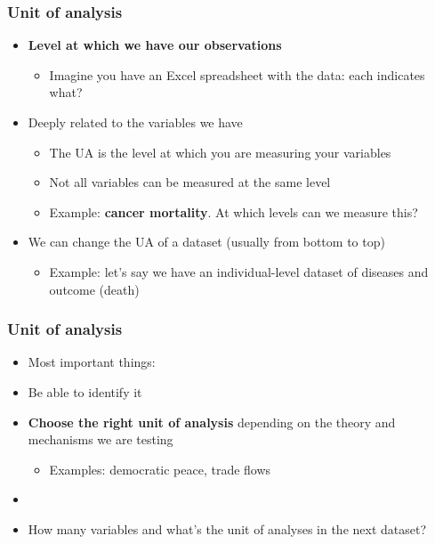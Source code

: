 \documentclass[aspectratio=43]{beamer}
\begin{document}
\begin{frame}
\frametitle{Unit of analysis}
\centering

\begin{itemize}
  \item<2-> \textbf{Level at which we have our observations}
  \begin{itemize}
    \item Imagine you have an Excel spreadsheet with the data: each  indicates what?
  \end{itemize}
  \item<3-> Deeply related to the variables we have
  \begin{itemize}
    \item The UA is the level at which you are measuring your variables
    \item<4-> Not all variables can be measured at the same level
    \item<5-> Example: \textbf{cancer mortality}. At which levels can we measure this?
  \end{itemize}
  \item<6-> We can change the UA of a dataset (usually from bottom to top)
  \begin{itemize}
    \item Example: let's say we have an individual-level dataset of diseases and outcome (death)
  \end{itemize}
\end{itemize}

\end{frame}

\begin{frame}
\frametitle{Unit of analysis}
\centering

\begin{itemize}
  \item[] Most important things:
  \item Be able to identify it
  \item \textbf{Choose the right unit of analysis} depending on the theory and mechanisms we are testing
  \begin{itemize}
    \item Examples: democratic peace, trade flows
  \end{itemize}
  \item[]
  \item<2-> How many variables and what's the unit of analyses in the next dataset?
\end{itemize}

\end{frame}
\end{document}
